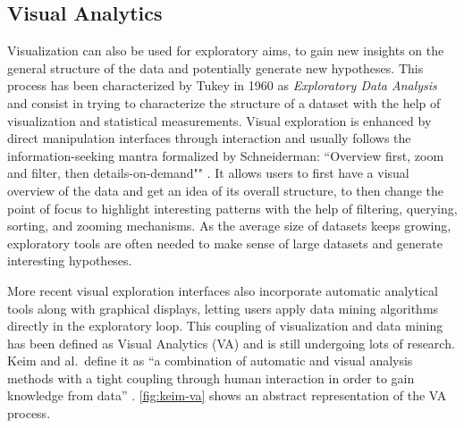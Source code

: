 

\subsection{Visual Analytics}

Visualization can also be used for exploratory aims, to gain new insights on the general structure of the data and potentially generate new hypotheses.
This process has been characterized by Tukey in 1960 as \emph{Exploratory Data Analysis} \cite{tukeyExploratoryDataAnalysis1977} and consist in trying to characterize the structure of a dataset with the help of visualization and statistical measurements.
Visual exploration is enhanced by direct manipulation interfaces through interaction and usually follows the information-seeking mantra formalized by Schneiderman: ``Overview first, zoom and filter, then details-on-demand"" \cite{shneidermanEyesHaveIt1996}.
It allows users to first have a visual overview of the data and get an idea of its overall structure, to then change the point of focus to highlight interesting patterns with the help of filtering, querying, sorting, and zooming mechanisms.
As the average size of datasets keeps growing, exploratory tools are often needed to make sense of large datasets and generate interesting hypotheses.

More recent visual exploration interfaces also incorporate automatic analytical tools along with graphical displays, letting users apply data mining algorithms directly in the exploratory loop.
This coupling of visualization and data mining has been defined as Visual Analytics (VA) and is still undergoing lots of research.
Keim and al.\ define it as ``a combination of automatic and visual analysis methods with a tight coupling through human interaction in order to gain knowledge from data'' \cite{keimVisualAnalyticsDefinition2008}. \autoref{fig:keim-va} shows an abstract representation of the VA process.

